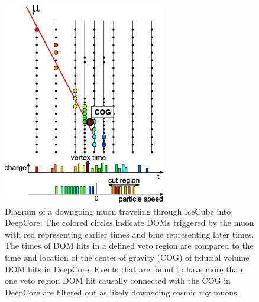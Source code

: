 \documentclass{gatech-thesis}
\begin{document}
\begin{figure}[ht]
  \begin{center}
    \includegraphics[width=.5\textwidth,keepaspectratio]{DeepCoreVeto.jpg}
  \end{center}
  \caption[DeepCore Veto Algorithm]{Diagram of a downgoing muon traveling through IceCube into DeepCore. The colored circles indicate DOMs triggered by the muon with red representing earlier times and blue representing later times. The times of DOM hits in a defined veto region are compared to the time and location of the center of gravity (COG) of fiducial volume DOM hits in DeepCore. Events that are found to have more than one veto region DOM hit causally connected with the COG in DeepCore are filtered out as likely downgoing cosmic ray muons \cite{2012APh....35..615A}.}
  \label{fig:DCVetoSketch}
\end{figure}
\end{document}
